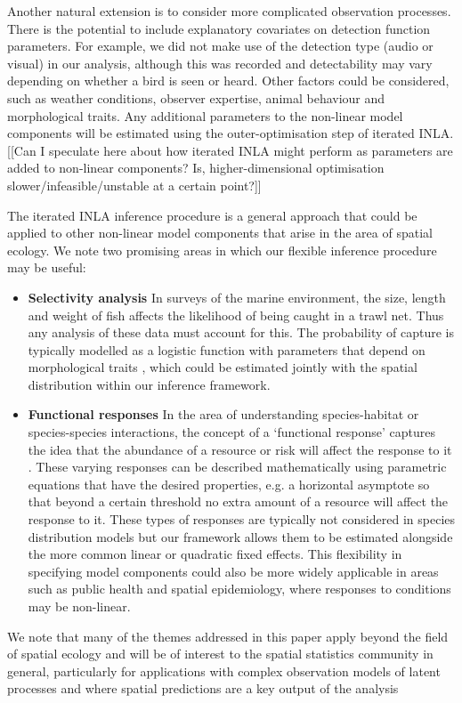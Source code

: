 \documentclass{stylefile16/statsoc}
\begin{document}
Another natural extension is to consider more complicated observation processes.  There is the potential to include explanatory covariates on detection function parameters.  For example, we did not make use of the detection type (audio or visual) in our analysis, although this was recorded and detectability may vary depending on whether a bird is seen or heard.  Other factors could be considered, such as weather conditions, observer expertise, animal behaviour and morphological traits.  Any additional parameters to the non-linear model components will be estimated using the outer-optimisation step of iterated INLA.  [[Can I speculate here about how iterated INLA might perform as parameters are added to non-linear components?  Is, higher-dimensional optimisation slower/infeasible/unstable at a certain point?]]

The iterated INLA inference procedure is a general approach that could be applied to other non-linear model components that arise in the area of spatial ecology.  We note two promising areas in which our flexible inference procedure may be useful:

\begin{itemize}
	\item \textbf{Selectivity analysis} In surveys of the marine environment, the size, length and weight of fish affects the likelihood of being caught in a trawl net.  Thus any analysis of these data must account for this.  The probability of capture is typically modelled as a logistic function with parameters that depend on morphological traits \citep{herrmann_understanding_2016, madsen_selectivity_2007, galbraith_demersal_1994}, which could be estimated jointly with the spatial distribution within our inference framework.
	\item \textbf{Functional responses} In the area of understanding species-habitat or species-species interactions, the concept of a `functional response' captures the idea that the abundance of a resource or risk will affect the response to it \citep{holling_some_1959}.  These varying responses can be described mathematically using parametric equations that have the desired properties, e.g. a horizontal asymptote so that beyond a certain threshold no extra amount of a resource will affect the response to it.  These types of responses are typically not considered in species distribution models but our framework allows them to be estimated alongside the more common linear or quadratic fixed effects. This flexibility in specifying model components could also be more widely applicable in areas such as public health and spatial epidemiology, where responses to conditions may be non-linear.

\end{itemize}
We note that many of the themes addressed in this paper apply beyond the field of spatial ecology and will be of interest to the spatial statistics community in general, particularly for applications with complex observation models of latent processes and where spatial predictions are a key output of the analysis
\end{document}
